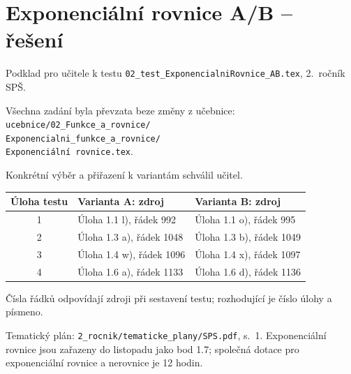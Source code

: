 \documentclass[a4paper,10pt]{article}
\begin{document}
\section*{Exponenciální rovnice A/B -- řešení}
Podklad pro učitele k testu
\texttt{02\_test\_ExponencialniRovnice\_AB.tex}, 2.~ročník SPŠ.

Všechna zadání byla převzata beze změny z učebnice:\\
\texttt{ucebnice/02\_Funkce\_a\_rovnice/}\\
\texttt{Exponencialni\_funkce\_a\_rovnice/}\\
\texttt{Exponenciální rovnice.tex}.

Konkrétní výběr a přiřazení k variantám schválil učitel.

\begin{center}
\begin{tabular}{c|ll}
Úloha testu & Varianta A: zdroj & Varianta B: zdroj\\ \hline
1 & Úloha 1.1 l), řádek 992 & Úloha 1.1 o), řádek 995\\
2 & Úloha 1.3 a), řádek 1048 & Úloha 1.3 b), řádek 1049\\
3 & Úloha 1.4 w), řádek 1096 & Úloha 1.4 x), řádek 1097\\
4 & Úloha 1.6 a), řádek 1133 & Úloha 1.6 d), řádek 1136
\end{tabular}
\end{center}
Čísla řádků odpovídají zdroji při sestavení testu; rozhodující je číslo úlohy a písmeno.

Tematický plán: \texttt{2\_rocnik/tematicke\_plany/SPS.pdf}, s.~1.
Exponenciální rovnice jsou zařazeny do listopadu jako bod 1.7;
společná dotace pro exponenciální rovnice a nerovnice je 12 hodin.
\end{document}
